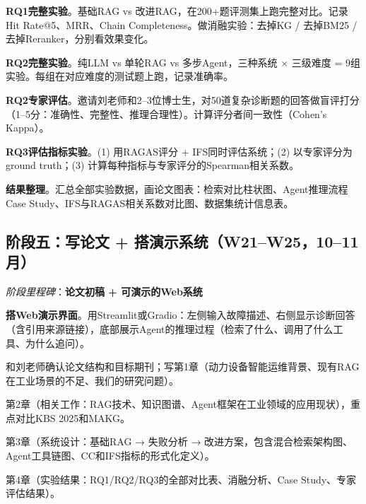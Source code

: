 \documentclass[a4paper, 11pt]{ctexart}
\begin{document}
\begin{description}[style=nextline, leftmargin=1.2cm, labelwidth=1cm, font=\bfseries\color{tsinghua}]
\item[W16] \textbf{RQ1完整实验}。基础RAG vs 改进RAG，在200+题评测集上跑完整对比。记录Hit Rate@5、MRR、Chain Completeness。做消融实验：去掉KG / 去掉BM25 / 去掉Reranker，分别看效果变化。
\item[W17] \textbf{RQ2完整实验}。纯LLM vs 单轮RAG vs 多步Agent，三种系统 $\times$ 三级难度 = 9组实验。每组在对应难度的测试题上跑，记录准确率。
\item[W18] \textbf{RQ2专家评估}。邀请刘老师和2--3位博士生，对50道复杂诊断题的回答做盲评打分（1--5分：准确性、完整性、推理合理性）。计算评分者间一致性（Cohen's Kappa）。
\item[W19] \textbf{RQ3评估指标实验}。(1) 用RAGAS评分 + IFS同时评估系统；(2) 以专家评分为ground truth；(3) 计算每种指标与专家评分的Spearman相关系数。
\item[W20] \textbf{结果整理}。汇总全部实验数据，画论文图表：检索对比柱状图、Agent推理流程Case Study、IFS与RAGAS相关系数对比图、数据集统计信息表。
\end{description}

\subsection{阶段五：写论文 + 搭演示系统（W21--W25，10--11月）}

\noindent\textit{阶段里程碑}：{\color{tsinghua}\textbf{论文初稿 + 可演示的Web系统}}

\begin{description}[style=nextline, leftmargin=1.2cm, labelwidth=1cm, font=\bfseries\color{tsinghua}]
\item[W21] \textbf{搭Web演示界面}。用Streamlit或Gradio：左侧输入故障描述、右侧显示诊断回答（含引用来源链接），底部展示Agent的推理过程（检索了什么、调用了什么工具、为什么追问）。
\item[W22] 和刘老师确认论文结构和目标期刊；写第1章（动力设备智能运维背景、现有RAG在工业场景的不足、我们的研究问题）。
\item[W23] 第2章（相关工作：RAG技术、知识图谱、Agent框架在工业领域的应用现状），重点对比KBS 2025和MAKG。
\item[W24] 第3章（系统设计：基础RAG → 失败分析 → 改进方案，包含混合检索架构图、Agent工具链图、CC和IFS指标的形式化定义）。
\item[W25] 第4章（实验结果：RQ1/RQ2/RQ3的全部对比表、消融分析、Case Study、专家评估结果）。
\end{description}
\end{document}
